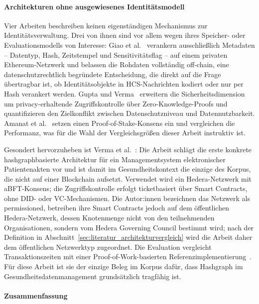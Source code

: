 \paragraph{Architekturen ohne ausgewiesenes Identitätsmodell}
\label{par:literatur_ohne_idmodell}

Vier Arbeiten beschreiben keinen eigenständigen Mechanismus zur Identitätsverwaltung. Drei von ihnen sind vor allem wegen ihres Speicher- oder Evaluationsmodells von Interesse: Giao et al.~\cite{giao2026} verankern ausschließlich Metadaten -- Datentyp, Hash, Zeitstempel und Sensitivitätsflag -- auf einem privaten Ethereum-Netzwerk und belassen die Rohdaten vollständig off-chain, eine datenschutzrechtlich begründete Entscheidung, die direkt auf die Frage übertragbar ist, ob Identitätsobjekte in HCS-Nachrichten kodiert oder nur per Hash verankert werden. Gupta und Verma~\cite{guptaverma2026} erweitern die Sicherheitsdimension um privacy-erhaltende Zugriffskontrolle über Zero-Knowledge-Proofs und quantifizieren den Zielkonflikt zwischen Datenschutzniveau und Datennutzbarkeit. Amanat et al.~\cite{amanat2022} setzen einen Proof-of-Stake-Konsens ein und vergleichen die Performanz, was für die Wahl der Vergleichsgrößen dieser Arbeit instruktiv ist.

Gesondert hervorzuheben ist Verma et al.~\cite{verma2024}: Die Arbeit schlägt die erste konkrete hashgraphbasierte Architektur für ein Managementsystem elektronischer Patientenakten vor und ist damit im Gesundheitskontext die einzige des Korpus, die nicht auf einer Blockchain aufsetzt. Verwendet wird ein Hedera-Netzwerk mit aBFT-Konsens; die Zugriffskontrolle erfolgt ticketbasiert über Smart Contracts, ohne DID- oder VC-Mechanismen. Die Autor:innen bezeichnen das Netzwerk als permissioned, betreiben ihre Smart Contracts jedoch auf dem öffentlichen Hedera-Netzwerk, dessen Knotenmenge nicht von den teilnehmenden Organisationen, sondern vom Hedera Governing Council bestimmt wird; nach der Definition in Abschnitt~\ref{sec:literatur_architekturvergleich} wird die Arbeit daher dem öffentlichen Netzwerktyp zugeordnet. Die Evaluation vergleicht Transaktionszeiten mit einer Proof-of-Work-basierten Referenzimplementierung~\cite{verma2024}. Für diese Arbeit ist sie der einzige Beleg im Korpus dafür, dass Hashgraph im Gesundheitsdatenmanagement grundsätzlich tragfähig ist.

\paragraph{Zusammenfassung}
\label{par:literatur_architectures_zusammenfassung}

